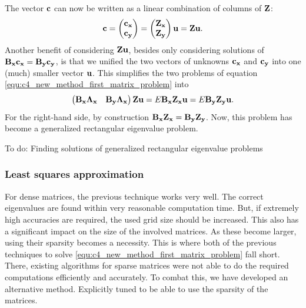 The vector $\vb{c}$ can now be written as a linear combination of columns of $\vb{Z}$:
$$
    \vb{c} = \begin{pmatrix}\vb{c_x} \\ \vb{c_y} \end{pmatrix} = \begin{pmatrix} \vb{Z_x} \\ \vb{Z_y} \end{pmatrix}  \vb{u} = \vb{Z} \vb{u} \text{.}
$$
Another benefit of considering $\vb{Z}\vb{u}$, besides only considering solutions of $\vb{B_x} \vb{c_x} = \vb{B_y} \vb{c_y}$, is that we unified the two vectors of unknowns $\vb{c_x}$ and $\vb{c_y}$ into one (much) smaller vector $\vb{u}$. This simplifies the two problems of equation \eqref{equ:c4_new_method_first_matrix_problem} into
$$
    \begin{pmatrix}
        \vb{B_x}\vb{\Lambda_x} & \vb{B_y}\vb{\Lambda_x}
    \end{pmatrix} \vb{Z} \vb{u} = E \vb{B_x} \vb{Z_x} \vb{u} = E \vb{B_y} \vb{Z_y} \vb{u} \text{.}
$$
For the right-hand side, by construction $\vb{B_x} \vb{Z_x} = \vb{B_y} \vb{Z_y}$. Now, this problem has become a generalized rectangular eigenvalue problem.

    {\color{red}To do: Finding solutions of generalized rectangular eigenvalue problems}

\subsubsection{Least squares approximation}

For dense matrices, the previous technique works very well. The correct eigenvalues are found within very reasonable computation time. But, if extremely high accuracies are required, the used grid size should be increased. This also has a significant impact on the size of the involved matrices. As these become larger, using their sparsity becomes a necessity. This is where both of the previous techniques to solve \eqref{equ:c4_new_method_first_matrix_problem} fall short. There, existing algorithms for sparse matrices were not able to do the required computations efficiently and accurately. To combat this, we have developed an alternative method. Explicitly tuned to be able to use the sparsity of the matrices.

